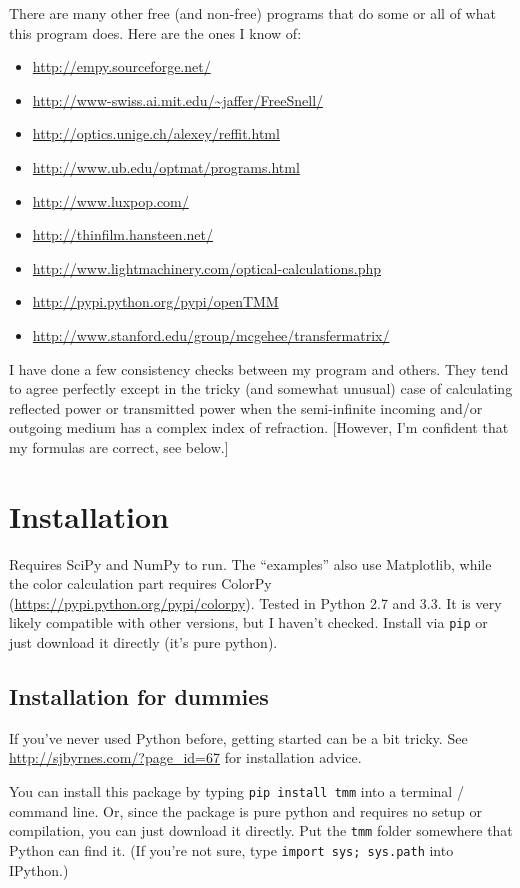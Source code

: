 \documentclass[12pt]{article}
\renewcommand{\(}{\left(}
\renewcommand{\)}{\right)}
\begin{document}
There are many other free (and non-free) programs that do some or all of what this program does. Here are the ones I know of:
\begin{itemize}
\item \url{http://empy.sourceforge.net/}
\item \url{http://www-swiss.ai.mit.edu/~jaffer/FreeSnell/}
\item \url{http://optics.unige.ch/alexey/reffit.html}
\item \url{http://www.ub.edu/optmat/programs.html}
\item \url{http://www.luxpop.com/}
\item \url{http://thinfilm.hansteen.net/}
\item \url{http://www.lightmachinery.com/optical-calculations.php}
\item \url{http://pypi.python.org/pypi/openTMM}
\item \url{http://www.stanford.edu/group/mcgehee/transfermatrix/}
\end{itemize}

I have done a few consistency checks between my program and others. They tend to agree perfectly except in the tricky (and somewhat unusual) case of calculating reflected power or transmitted power when the semi-infinite incoming and/or outgoing medium has a complex index of refraction. [However, I'm confident that my formulas are correct, see below.]

\section{Installation}

Requires SciPy and NumPy to run. The ``examples'' also use Matplotlib, while the color calculation part requires ColorPy (\url{https://pypi.python.org/pypi/colorpy}). Tested in Python 2.7 and 3.3. It is very likely compatible with other versions, but I haven't checked. Install via \verb=pip= or just download it directly (it's pure python).

\subsection{Installation for dummies}

If you've never used Python before, getting started can be a bit tricky. See \url{http://sjbyrnes.com/?page_id=67} for installation advice.

You can install this package by typing \verb=pip install tmm= into a terminal / command line. Or, since the package is pure python and requires no setup or compilation, you can just download it directly. Put the \verb=tmm= folder somewhere that Python can find it. (If you're not sure, type \verb=import sys; sys.path= into IPython.)
\end{document}
